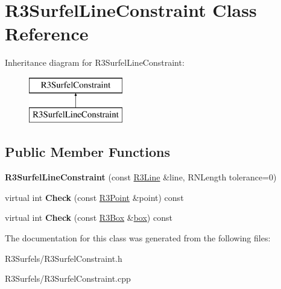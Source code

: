 \hypertarget{class_r3_surfel_line_constraint}{}\section{R3\+Surfel\+Line\+Constraint Class Reference}
\label{class_r3_surfel_line_constraint}
Inheritance diagram for R3\+Surfel\+Line\+Constraint\+:\begin{figure}[H]
\begin{center}
\leavevmode
\includegraphics[height=2.000000cm]{class_r3_surfel_line_constraint}
\end{center}
\end{figure}
\subsection*{Public Member Functions}
\begin{DoxyCompactItemize}
\item 
{\bfseries R3\+Surfel\+Line\+Constraint} (const \hyperlink{class_r3_line}{R3\+Line} \&line, R\+N\+Length tolerance=0)\hypertarget{class_r3_surfel_line_constraint_a9ba4394eb63280cedf9285d16dba46ec}{}\label{class_r3_surfel_line_constraint_a9ba4394eb63280cedf9285d16dba46ec}

\item 
virtual int {\bfseries Check} (const \hyperlink{class_r3_point}{R3\+Point} \&point) const \hypertarget{class_r3_surfel_line_constraint_af1defba766c81b2fbee8f981be41e4e9}{}\label{class_r3_surfel_line_constraint_af1defba766c81b2fbee8f981be41e4e9}

\item 
virtual int {\bfseries Check} (const \hyperlink{class_r3_box}{R3\+Box} \&\hyperlink{structbox}{box}) const \hypertarget{class_r3_surfel_line_constraint_a6729a1ce89fc069e3e4e7794c0c3c7d6}{}\label{class_r3_surfel_line_constraint_a6729a1ce89fc069e3e4e7794c0c3c7d6}

\end{DoxyCompactItemize}


The documentation for this class was generated from the following files\+:\begin{DoxyCompactItemize}
\item 
R3\+Surfels/R3\+Surfel\+Constraint.\+h\item 
R3\+Surfels/R3\+Surfel\+Constraint.\+cpp\end{DoxyCompactItemize}
